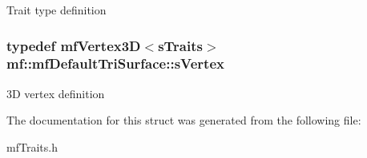 \label{structmf_1_1mfDefaultTriSurface_a5c521b16ac8225693266fec444241084}
Trait type definition \hypertarget{structmf_1_1mfDefaultTriSurface_a6470bc28e1c9e3c9524a4a3ac6718e94}{
\subsubsection[{sVertex}]{\setlength{\rightskip}{0pt plus 5cm}typedef {\bf mfVertex3D}$<${\bf sTraits}$>$ {\bf mf::mfDefaultTriSurface::sVertex}}}
\label{structmf_1_1mfDefaultTriSurface_a6470bc28e1c9e3c9524a4a3ac6718e94}
3D vertex definition 

The documentation for this struct was generated from the following file:\begin{DoxyCompactItemize}
\item 
mfTraits.h\end{DoxyCompactItemize}
